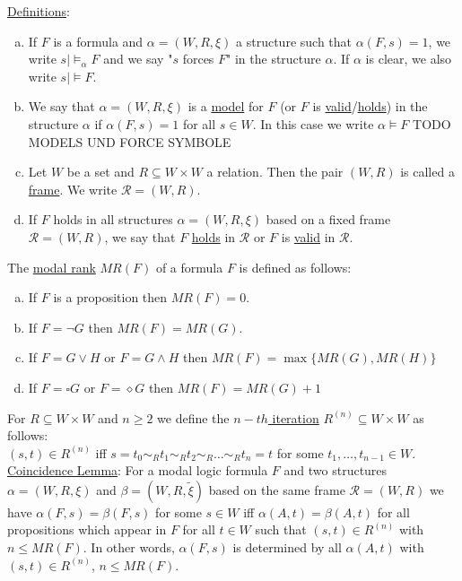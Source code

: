 \documentclass[a4paper]{article}
\newcommand{\ul}{\underline}
\begin{document}
\ul{Definitions}:
\begin{enumerate}[(a)]
	\item If $F$ is a formula and $\alpha=(W,R,\xi)$ a structure such that $\alpha(F,s)=1$, we write $s\vert\models_\alpha F$ and we say "$s$ forces $F$" in the structure $\alpha$. If $\alpha$ is clear, we also write $s\vert\models F$.
	\item We say that $\alpha=(W,R,\xi)$ is a \ul{model} for $F$ (or $F$ is \ul{valid}/\ul{holds}) in the structure $\alpha$ if $\alpha(F,s)=1$ for all $s\in W$. In this case we write $\alpha\models F$ TODO MODELS UND FORCE SYMBOLE
	\item Let $W$ be a set and $R\subseteq W\times W$ a relation. Then the pair $(W,R)$ is called a \ul{frame}. We write $\mathcal{R}=(W,R)$.
	\item If $F$ holds in all structures $\alpha=(W,R,\xi)$ based on a fixed frame $\mathcal{R}=(W,R)$, we say that $F$ \ul{holds} in $\mathcal{R}$ or $F$ is \ul{valid} in $\mathcal{R}$.
\end{enumerate}
The \ul{modal rank} $MR(F)$ of a formula $F$ is defined as follows:
\begin{enumerate}[(a)]
	\item If $F$ is a proposition then $MR(F)=0$.
	\item If $F=\neg G$ then $MR(F)=MR(G)$.
	\item If $F=G\vee H$ or $F=G\wedge H$ then $MR(F)=\max\{MR(G),MR(H)\}$
	\item If $F=\square G$ or $F=\diamond G$ then $MR(F)=MR(G)+1$
\end{enumerate}
For $R\subseteq W\times W$ and $n\geq 2$ we define the \ul{$n-th$ iteration} $R^{(n)}\subseteq W\times W$ as follows:\\
$(s,t)\in R^{(n)}$ iff $s=t_0\sim_R t_1\sim_R t_2\sim_R\dots\sim_R t_n=t$ for some $t_1,\dots,t_{n-1}\in W$.\\
\ul{Coincidence Lemma}: For a modal logic formula $F$ and two structures $\alpha=(W,R,\xi)$ and $\beta=(W,R,\tilde\xi)$ based on the same frame $\mathcal{R}=(W,R)$ we have $\alpha(F,s)=\beta(F,s)$ for some $s\in W$ iff $\alpha(A,t)=\beta(A,t)$ for all propositions which appear in $F$ for all $t\in W$ such that $(s,t)\in R^{(n)}$ with $n\leq MR(F)$. In other words, $\alpha(F,s)$ is determined by all $\alpha(A,t)$ with $(s,t)\in R^{(n)}$, $n\leq MR(F)$.\\
\end{document}
